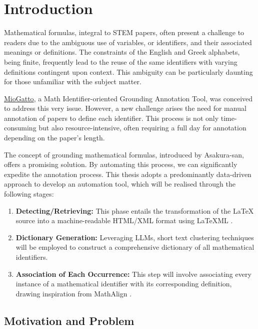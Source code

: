 \chapter{Introduction}\label{chapter:introduction}

Mathematical formulas, integral to STEM papers, often present a challenge to readers due to the ambiguous use of variables, or identifiers, and their associated meanings or definitions. The constraints of the English and Greek alphabets, being finite, frequently lead to the reuse of the same identifiers with varying definitions contingent upon context. This ambiguity can be particularly daunting for those unfamiliar with the subject matter.

\href{https://github.com/wtsnjp/MioGatto/tree/main}{MioGatto}, a Math Identifier-oriented Grounding Annotation Tool, was conceived to address this very issue. However, a new challenge arises the need for manual annotation of papers to define each identifier. This process is not only time-consuming but also resource-intensive, often requiring a full day for annotation depending on the paper's length.

The concept of grounding mathematical formulas, introduced by Asakura-san, offers a promising solution. By automating this process, we can significantly expedite the annotation process. This thesis adopts a predominantly data-driven approach to develop an automation tool, which will be realised through the following stages:

\begin{enumerate}
    \item \textbf{Detecting/Retrieving:} This phase entails the transformation of the LaTeX source into a machine-readable HTML/XML format using LaTeXML \cite{ginev2011latexml}.
    
    \item \textbf{Dictionary Generation:} Leveraging \ac{LLMs}, short text clustering techniques will be employed to construct a comprehensive dictionary of all mathematical identifiers.
    
    \item \textbf{Association of Each Occurrence:} This step will involve associating every instance of a mathematical identifier with its corresponding definition, drawing inspiration from MathAlign \cite{alexeeva2020mathalign}.
\end{enumerate}


\section{Motivation and Problem}

